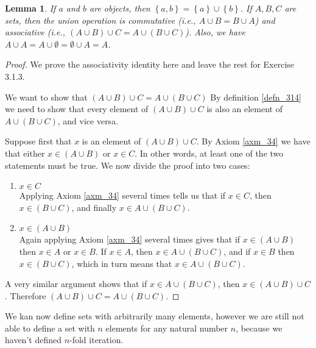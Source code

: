 \documentclass[a4paper, twocolumn]{report}
\newcounter{dummy} \numberwithin{dummy}{section}
\newtheorem{lma}[dummy]{Lemma}
\theoremstyle{definition}
\theoremstyle{solution}
\newcommand{\union}{\cup}
\begin{document}
\begin{lma}
  \label{lma_3113} 
  If $a$ and $b$ are objects, then $\left\{ a, b \right\} = \left\{ a \right\}
  \union \left\{ b \right\}$. If $A, B, C$ are sets, then the union operation
  is commutative (i.e., $A \union B = B \union A$) and associative (i.e.,
  $\left( A\union B \right)\union C = A\union(B\union C)$). Also, we have $A
  \union A = A \union \emptyset = \emptyset \union A = A$. 
\end{lma}

\begin{proof}
  We prove the associativity identity here and leave the rest for Exercise 3.1.3.

  We want to show that $\left( A\union B \right)\union C = A\union(B\union C)$
  By definition \ref{defn_314} we need to show that every element of $\left(
  A\union B \right)\union C$ is also an element of $A\union(B\union C)$, and
  vice versa.

  Suppose first that $x$ is an element of $(A \union B) \union C$. By Axiom
  \ref{axm_34} we have that either $x \in (A \union B)$ or $x \in C$. In other words, at
  least one of the two statements must be true.
  We now divide the proof into two cases:

  \begin{enumerate}
    \item $ x \in C$ \\
      [0.2cm]
      Applying Axiom \ref{axm_34} several times tells us that if $x \in C$,
      then $x \in (B \union C)$, and finally $x \in A \union (B \union C)$.

    \item $ x \in (A \union B)$ \\
      [0.2cm]
      Again applying Axiom \ref{axm_34} several times gives that if $x \in (A
      \union B)$ then $x \in A$ or $x \in B$.  If $x \in A$, then $x \in
      A\union(B\union C)$, and if $x \in B$ then $x \in (B \union C)$, which in
      turn means that $x \in A \union (B \union C)$. 
  \end{enumerate}

  A very similar argument shows that if $x \in A \union (B \union C)$, then $ x
  \in (A\union B) \union C$.  Therefore $\left( A\union B \right)\union C = A\union(B\union C)$.
\end{proof}
\addtocounter{dummy}{1}

We kan now define sets with arbitrarily many elements, however we are still not
able to define a set with $n$ elements for any natural number $n$, because we
haven't defined $n$-fold iteration.
\end{document}
